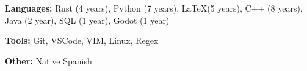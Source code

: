 \documentclass[../main.tex]{subfiles}
\begin{document}

 \textbf{Languages:} Rust (4 years), Python (7 years), \LaTeX (5 years), C++ (8 years), Java (2 year), SQL (1 year), Godot (1 year)

 \textbf{Tools:} Git, VSCode, VIM, Linux, Regex

 \textbf{Other:} Native Spanish 
\end{document}
